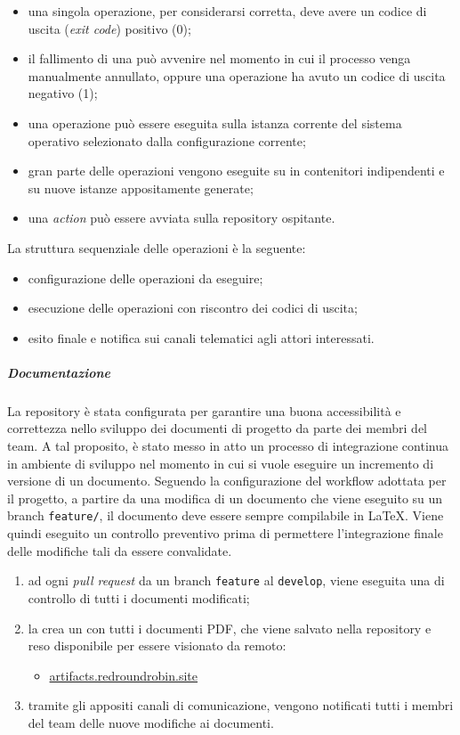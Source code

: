 		\begin{itemize}
			\item una singola operazione, per considerarsi corretta, deve avere un codice di uscita (\textit{exit code}) positivo (0);
			\item il fallimento di una  può avvenire nel momento in cui il processo venga manualmente annullato, oppure una operazione ha avuto un codice di uscita negativo (1);
			\item una operazione può essere eseguita sulla istanza corrente del sistema operativo selezionato dalla configurazione corrente;
			\item gran parte delle operazioni vengono eseguite su  in contenitori indipendenti e su nuove istanze appositamente generate;
			\item una \textit{action} può essere avviata sulla repository ospitante.
		\end{itemize}

		La struttura sequenziale delle operazioni è la seguente:

		\begin{itemize}
			\item configurazione delle operazioni da eseguire;
			\item esecuzione delle operazioni con riscontro dei codici di uscita;
			\item esito finale e notifica sui canali telematici agli attori interessati.
		\end{itemize}

		\subparagraph{Documentazione}

		La repository è stata configurata per garantire una buona accessibilità e correttezza nello sviluppo dei documenti di progetto da parte dei membri del team. A tal proposito, è stato messo in atto un processo di integrazione continua in ambiente di sviluppo nel momento in cui si vuole eseguire un incremento di versione di un documento. 
		Seguendo la configurazione del workflow adottata per il progetto, a partire da una modifica di un documento che viene eseguito su un branch \verb!feature/!, il documento deve essere sempre compilabile in \LaTeX{}. 
		Viene quindi eseguito un controllo preventivo prima di permettere l'integrazione finale delle modifiche tali da essere convalidate.

		\begin{enumerate}
			\item ad ogni \textit{pull request} da un branch \verb!feature! al \verb!develop!, viene eseguita una  di controllo di tutti i documenti modificati;
			\item la  crea un  con tutti i documenti PDF, che viene salvato nella repository e reso disponibile per essere visionato da remoto:
			\begin{itemize}
				\item \href{https://artifacts.redroundrobin.site}{artifacts.redroundrobin.site}
			\end{itemize}
			\item tramite gli appositi canali di comunicazione, vengono notificati tutti i membri del team delle nuove modifiche ai documenti.
		\end{enumerate}

